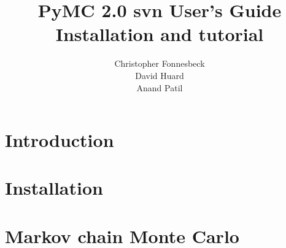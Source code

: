 \documentclass[]{manual}
\title{PyMC 2.0 svn User's Guide \\
Installation and tutorial}
\author{ Christopher Fonnesbeck\\ David Huard \\ Anand Patil }
\begin{document}
\maketitle

\tableofcontents

\chapter{Introduction} %


\chapter{Installation} %


\chapter{Markov chain Monte Carlo} %




\end{document}
